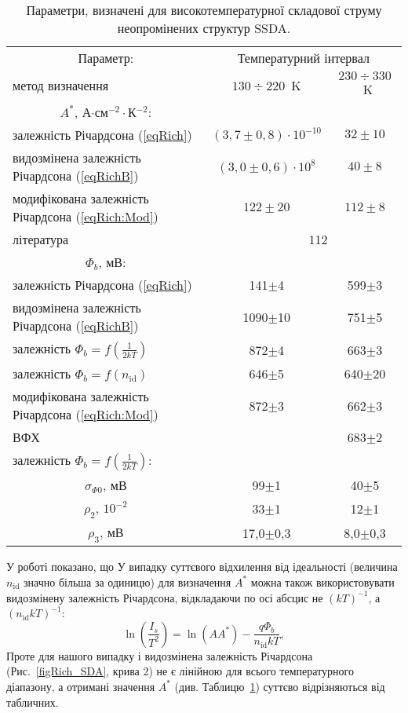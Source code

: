 \begin{table}
\caption{\label{tabPar:SSDA}Параметри, визначені для високотемпературної складової струму неопромінених структур SSDA.
}
\center
\begin{tabular}{|l|c|c|}
\hline
\multicolumn{1}{|c|}{Параметр:}& \multicolumn{2}{c|}{Температурний інтервал}\\ \cline{2-3}
метод визначення&$130\div220$~K&$230\div330$~K\\
\hline
\multicolumn{1}{|c|}{$A^*$, А$\cdot$см$^{-2}\cdot$К$^{-2}$:}&&\\
залежність Річардсона (\ref{eqRich})&$(3,7\pm0,8)\cdot10^{-10}$&$32\pm10$\\
видозмінена залежність Річардсона (\ref{eqRichB})&$(3,0\pm0,6)\cdot10^{8}$&$40\pm8$\\
модифікована залежність Річардсона (\ref{eqRich:Mod})&$122\pm20$&$112\pm8$\\
література  \cite{Schroder2006}& \multicolumn{2}{c|}{$\,\,\,\,\,\,\,\,\,\,\,\,$   112}\\ \hline
\multicolumn{1}{|c|}{$\Phi_b$, мВ:}&&\\
залежність Річардсона (\ref{eqRich})&141$\pm$4&599$\pm$3\\
видозмінена залежність Річардсона (\ref{eqRichB})&1090$\pm$10&751$\pm$5\\
залежність $\Phi_b=f(\frac{1}{2kT})$&872$\pm$4&663$\pm$3\\
залежність $\Phi_b=f(n_\mathrm{id})$&646$\pm$5&640$\pm$20\\
модифікована залежність Річардсона (\ref{eqRich:Mod})&872$\pm$3&662$\pm$3\\
ВФХ &&683$\pm$2\\
\hline
залежність $\Phi_b=f(\frac{1}{2kT})$:&&\\
\multicolumn{1}{|c|}{$\sigma_{\Phi0}$, мВ} &99$\pm$1&40$\pm$5\\
\multicolumn{1}{|c|}{$\rho_2$, $10^{-2}$} &33$\pm$1&12$\pm$1\\
\multicolumn{1}{|c|}{$\rho_3$, мВ }&17,0$\pm$0,3&8,0$\pm$0,3\\
\hline
\end{tabular}
\end{table}



У роботі \cite{Aldemir} показано, що
У випадку суттєвого відхилення від ідеальності (величина $n_\mathrm{id}$ значно більша за одиницю)
для визначення $A^*$ можна також використовувати \cite{Aldemir,Mohan} видозмінену залежність Річардсона,
відкладаючи по осі абсцис не $(kT)^{-1}$, а $(n_\mathrm{id} kT)^{-1}$:
\begin{equation}\label{eqRichB}
\ln\left(\frac{I_s}{T^2}\right)=\ln(AA^*)-\frac{q\Phi_b}{n_\mathrm{id}kT},
\end{equation}
Проте для нашого випадку і видозмінена залежність Річардсона (Рис.~\ref{figRich_SDA}, крива 2) не є лінійною для всього
температурного діапазону, а отримані значення $A^*$ (див. Таблицю~\ref{tabPar:SSDA}) суттєво відрізняються
від табличних.

